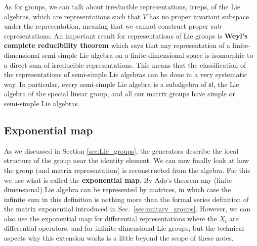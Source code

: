 \documentclass[notes.tex]{subfiles}
\begin{document}
As for groups, we can talk about irreducible representations, irreps, of the Lie algebras, which are representations such that $V$ has no proper invariant subspace under the representation, meaning that we cannot construct proper sub-representations.
An important result for representations of Lie groups is {\bf Weyl's complete reducibility theorem} which says that any representation of a finite-dimensional semi-simple Lie algebra  on a finite-dimensional space is isomorphic to a direct sum of irreducible representations. This means that the classification of the representations of semi-simple Lie algebras can be done in a very systematic way. In particular, every semi-simple Lie algebra is a subalgebra of $\mathfrak {sl}$, the Lie algebra of the special linear group, and all our matrix groups have simple or semi-simple Lie algebras.



\subsection{Exponential map}
\label{sec:expmap}
As we discussed in Section \ref{sec:Lie_groups}, the generators describe the local structure of the group near the identity element. We can now finally look at how the group (and matrix representation) is reconstructed from the algebra. For this we use what is called the {\bf exponential map}. 
By Ado's theorem any (finite-dimensional) Lie algebra can be represented by matrices, in which case the infinite sum in this definition is nothing more than the formal series definition of the matrix exponential introduced in Sec.~\ref{sec:unitary_groups}. However, we can also use the exponential map for differential representations where the $X_i$ are differential operators, and for infinite-dimensional Lie groups, but the technical aspects why this extension works is a little beyond the scope of these notes.
\end{document}
